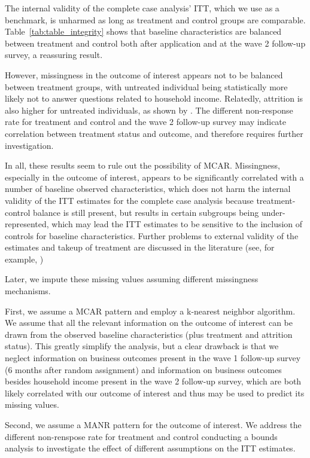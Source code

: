 The internal validity of the complete case analysis' ITT, which we use as a benchmark, is unharmed as long as treatment and control groups are comparable. Table~\ref{tab:table_integrity} shows that baseline characteristics are balanced between treatment and control both after application and at the wave 2 follow-up survey, a reassuring result.

However, missingness in the outcome of interest appears not to be balanced between treatment groups, with untreated individual being statistically more likely not to answer questions related to household income. Relatedly, attrition is also higher for untreated individuals, as shown by \cite{fairlie2015behind}. The different non-response rate for treatment and control and the wave 2 follow-up survey may indicate correlation between treatment status and outcome, and therefore requires further investigation.

In all, these results seem to rule out the possibility of MCAR. Missingness, especially in the outcome of interest, appears to be significantly correlated with a number of baseline observed characteristics, which does not harm the internal validity of the ITT estimates for the complete case analysis because treatment-control balance is still present, but results in certain subgroups being under-represented, which may lead the ITT estimates to be sensitive to the inclusion of controls for baseline characteristics. Further problems to external validity of the estimates and takeup of treatment are discussed in the literature (see, for example, \cite{millan2017})

Later, we impute these missing values assuming different missingness mechanisms.

First, we assume a MCAR pattern and employ a k-nearest neighbor algorithm. We assume that all the relevant information on the outcome of interest can be drawn from the observed baseline characteristics (plus treatment and attrition status). This greatly simplify the analysis, but a clear drawback is that we neglect information on business outcomes present in the wave 1 follow-up survey (6 months after random assignment) and information on business outcomes besides household income present in the wave 2 follow-up survey, which are both likely correlated with our outcome of interest and thus may be used to predict its missing values.

Second, we assume a MANR pattern for the outcome of interest. We address the different non-renspose rate for treatment and control conducting a bounds analysis to investigate the effect of different assumptions on the ITT estimates.

